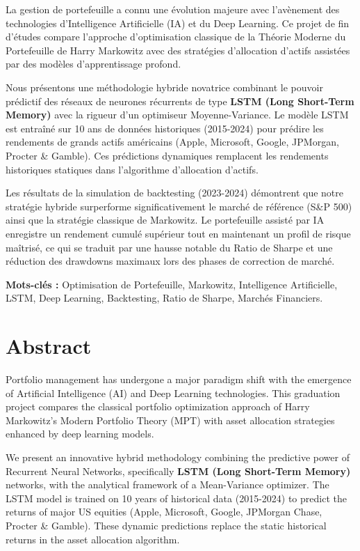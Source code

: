 La gestion de portefeuille a connu une évolution majeure avec l'avènement des technologies d'Intelligence Artificielle (IA) et du Deep Learning. Ce projet de fin d'études compare l'approche d'optimisation classique de la Théorie Moderne du Portefeuille de Harry Markowitz avec des stratégies d'allocation d'actifs assistées par des modèles d'apprentissage profond. 

Nous présentons une méthodologie hybride novatrice combinant le pouvoir prédictif des réseaux de neurones récurrents de type \textbf{LSTM (Long Short-Term Memory)} avec la rigueur d'un optimiseur Moyenne-Variance. Le modèle LSTM est entraîné sur 10 ans de données historiques (2015-2024) pour prédire les rendements de grands actifs américains (Apple, Microsoft, Google, JPMorgan, Procter \& Gamble). Ces prédictions dynamiques remplacent les rendements historiques statiques dans l'algorithme d'allocation d'actifs.

Les résultats de la simulation de backtesting (2023-2024) démontrent que notre stratégie hybride surperforme significativement le marché de référence (S\&P 500) ainsi que la stratégie classique de Markowitz. Le portefeuille assisté par IA enregistre un rendement cumulé supérieur tout en maintenant un profil de risque maîtrisé, ce qui se traduit par une hausse notable du Ratio de Sharpe et une réduction des drawdowns maximaux lors des phases de correction de marché.

\textbf{Mots-clés :} Optimisation de Portefeuille, Markowitz, Intelligence Artificielle, LSTM, Deep Learning, Backtesting, Ratio de Sharpe, Marchés Financiers.

\newpage

\chapter*{Abstract}

Portfolio management has undergone a major paradigm shift with the emergence of Artificial Intelligence (AI) and Deep Learning technologies. This graduation project compares the classical portfolio optimization approach of Harry Markowitz's Modern Portfolio Theory (MPT) with asset allocation strategies enhanced by deep learning models.

We present an innovative hybrid methodology combining the predictive power of Recurrent Neural Networks, specifically \textbf{LSTM (Long Short-Term Memory)} networks, with the analytical framework of a Mean-Variance optimizer. The LSTM model is trained on 10 years of historical data (2015-2024) to predict the returns of major US equities (Apple, Microsoft, Google, JPMorgan Chase, Procter \& Gamble). These dynamic predictions replace the static historical returns in the asset allocation algorithm.


